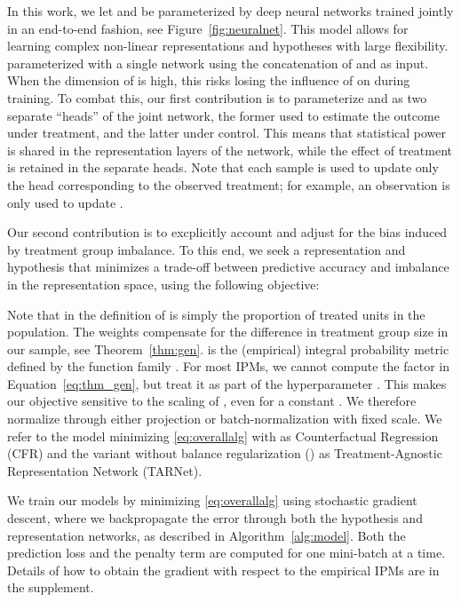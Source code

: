 \documentclass{article}
\def\tarnet{{TARNet}}
\begin{document}
In this work, we let  and  be parameterized by deep neural networks trained jointly in an end-to-end fashion, see Figure~\ref{fig:neuralnet}. This model allows for learning complex non-linear representations and hypotheses with large flexibility. \citet{johansson2016counterfactual} parameterized  with a single network using the concatenation of  and  as input. When the dimension of  is high, this risks losing the influence of  on  during training. To combat this, our first contribution is to parameterize  and  as two separate ``heads'' of the joint network, the former used to estimate the outcome under treatment, and the latter under control. This means that statistical power is shared in the representation layers of the network, while the effect of treatment is retained in the separate heads. Note that each sample is used to update only the head corresponding to the observed treatment; for example, an observation  is only used to update .

Our second contribution is to excplicitly account and adjust for the bias induced by treatment group imbalance. To this end, we seek a representation  and hypothesis  that minimizes a trade-off between predictive accuracy and imbalance in the representation space, using the following objective:

Note that  in the definition of  is simply the proportion of treated units in the population. The weights  compensate for the difference in treatment group size in our sample, see Theorem~\ref{thm:gen}.  is the (empirical) integral probability metric defined by the function family . For most IPMs, we cannot compute the factor  in Equation~\ref{eq:thm_gen}, but treat it as part of the hyperparameter . This makes our objective sensitive to the scaling of , even for a constant . We therefore normalize  through either projection or batch-normalization with fixed scale. We refer to the model minimizing \eqref{eq:overallalg} with  as Counterfactual Regression (CFR) and the variant without balance regularization () as Treatment-Agnostic Representation Network (\tarnet{}).

We train our models by minimizing \eqref{eq:overallalg} using stochastic gradient descent, where we backpropagate the error through both the hypothesis and representation networks, as described in Algorithm~\ref{alg:model}. Both the prediction loss and the penalty term  are computed for one mini-batch at a time. Details of how to obtain the gradient  with respect to the empirical IPMs are in the supplement.
\end{document}

